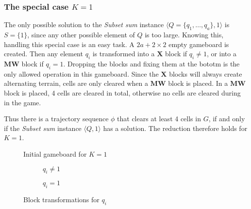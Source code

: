 \subsubsection{The special case $K = 1$}
The only possible solution to the \textit{Subset sum} instance $\langle Q = \{q_1, \ldots, q_a\}, 1 \rangle$ is $S = \{1\}$, since any other possible element of $Q$ is too large. Knowing this, handling this special case is an easy task. A $2a+2 \times 2$ empty gameboard is created. Then any element $q_i$ is transformed into a $\mathbf{X}$ block if $q_i \not = 1$, or into a $\mathbf{MW}$ block if $q_i = 1$. Dropping the blocks and fixing them at the bototm is the only allowed operation in this gameboard. Since the $\mathbf{X}$ blocks will always create alternating terrain, cells are only cleared when a $\mathbf{MW}$ block is placed. In a $\mathbf{MW}$ block is placed, 4 cells are cleared in total, otherwise no cells are cleared during in the game.

Thus there is a trajectory sequence $\phi$ that clears at least 4 cells in $G$, if and only if the \textit{Subset sum} instance $\langle Q, 1 \rangle$ has a solution. The reduction therefore holds for $K = 1$.

\begin{figure}[H]
    \centering
    \caption{Initial gameboard for $K=1$}
\end{figure}

\begin{figure}[H]
    \centering
    \begin{subfigure}[b]{0.10\textwidth}
        \caption{$q_i \not = 1$}
    \end{subfigure}
    \hspace{0.02\textwidth}
    \begin{subfigure}[b]{0.10\textwidth}
        \caption{$q_i = 1$}
    \end{subfigure}
    \caption{Block transformations for $q_i$}
\end{figure}
